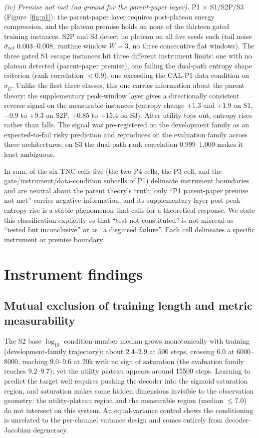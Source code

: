 \documentclass{article}
\begin{document}
\emph{(iv) Premise not met (no ground for the parent-paper layer).} P1 $\times$
S1/S2P/S3 (Figure~\ref{fig:p1}): the parent-paper layer requires post-plateau
energy compression, and
the plateau premise holds on none of the thirteen gated training instances. S2P
and S3 detect no plateau on all five seeds each (tail noise $\hat\sigma_{\rm rel}\
0.003$--$0.008$, runtime window $W=3$, no three consecutive flat windows). The
three gated S1 escape instances hit three different instrument limits: one with
no plateau detected (parent-paper premise), one failing the dual-path entropy
shape criterion (rank correlation $<0.9$), one exceeding the CAL-P1 data
condition on $\sigma_{\hat U}$. Unlike the first three classes, this one carries
information about the parent theory: the supplementary peak-window layer gives a
directionally consistent reverse signal on the measurable instances (entropy
change $+1.3$ and $+1.9$ on S1, $-0.9$ to $+9.3$ on S2P, $+0.85$ to $+15.4$ on
S3). After utility tops out, entropy rises rather than falls. The signal was
pre-registered on the development family as an expected-to-fail risky prediction
and reproduces on the evaluation family across three architectures; on S3 the
dual-path rank correlation $0.999$--$1.000$ makes it least ambiguous.

In sum, of the six TNC cells five (the two P4 cells, the P3 cell, and the
gate/instrument/data-condition subcells of P1) delineate instrument boundaries
and are neutral about the parent theory's truth; only ``P1 parent-paper premise
not met'' carries negative information, and its supplementary-layer post-peak
entropy rise is a stable phenomenon that calls for a theoretical response. We
state this classification explicitly so that ``test not constituted'' is not
misread as ``tested but inconclusive'' or as ``a disguised failure''. Each cell
delineates a specific instrument or premise boundary.

\section{Instrument findings}
\label{sec:instr}

\subsection{Mutual exclusion of training length and metric measurability}
\label{sec:geomexcl}

The S2 base $\log_{10}$ condition-number median grows monotonically with
training (development-family trajectory): about $2.4$--$2.9$ at $500$ steps,
crossing $6.0$ at $6000$--$8000$, reaching $9.0$--$9.6$ at 20k with no sign of
saturation (the evaluation family reaches $9.2$--$9.7$); yet the utility plateau
appears around 15500 steps. Learning to predict the target well requires pushing
the decoder into the sigmoid saturation region, and saturation makes some hidden
dimensions invisible to the observation geometry: the utility-plateau region and
the measurable region (median $\le 7.0$) do not intersect on this system. An
equal-variance control shows the conditioning is unrelated to the per-channel
variance design and comes entirely from decoder-Jacobian degeneracy.
\end{document}

